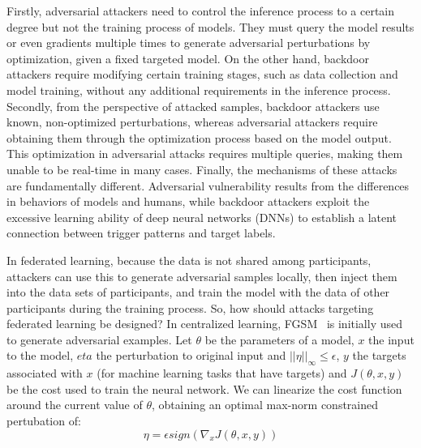 \documentclass[pdflatex,sn-mathphys-num]{sn-jnl}%
\theoremstyle{thmstyleone}%
\theoremstyle{thmstyletwo}%
\theoremstyle{thmstylethree}%
\begin{document}
Firstly, adversarial attackers need to control the
inference process to a certain degree but not the training
process of models. They must query the model results
or even gradients multiple times to generate adversarial
perturbations by optimization, given a fixed targeted
model. On the other hand, backdoor attackers require
modifying certain training stages, such as data collection
and model training, without any additional requirements
in the inference process. Secondly, from the perspective
of attacked samples, backdoor attackers use known,
non-optimized perturbations, whereas adversarial attackers
require obtaining them through the optimization process
based on the model output. This optimization in
adversarial attacks requires multiple queries, making them unable
to be real-time in many cases. Finally, the mechanisms
of these attacks are fundamentally different. Adversarial
vulnerability results from the differences in behaviors of
models and humans, while backdoor attackers exploit the
excessive learning ability of deep neural networks (DNNs)
to establish a latent connection between trigger patterns
and target labels.

In federated learning, because the data is not shared
among participants, attackers can use this to generate
adversarial samples locally, then inject them into the data
sets of participants, and train the model with the data of
other participants during the training process.
So, how should attacks targeting federated learning be
designed? In centralized learning, FGSM~\cite{goodfellow2014explaining} is initially
used to generate adversarial examples. Let $\theta$ be the parameters of a model, $x$ the input to the model,
$eta$ the perturbation to original input and $||\eta||_\infty \le \epsilon$,
$y$ the targets associated with $x$ (for machine learning tasks that have targets)
and $J(\theta, x, y)$ be the cost used to train the neural network.
We can linearize the cost function around the current value of $\theta$,
obtaining an optimal max-norm constrained pertubation of:
\begin{equation}
	\eta = \epsilon sign(\nabla_x J(\theta,x,y))
\end{equation}
\end{document}
